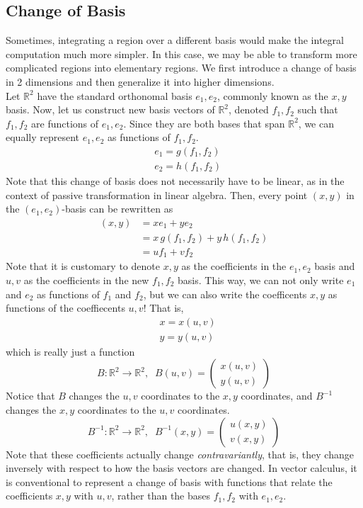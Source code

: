 \documentclass{article}
\theoremstyle{remark}
\theoremstyle{definition}
\begin{document}
\subsection{Change of Basis}
Sometimes, integrating a region over a different basis would make the integral computation much more simpler. In this case, we may be able to transform more complicated regions into elementary regions. We first introduce a change of basis in 2 dimensions and then generalize it into higher dimensions. 
\\
Let $\mathbb{R}^2$ have the standard orthonomal basis $e_1, e_2$, commonly known as the $x, y$ basis. Now, let us construct new basis vectors of $\mathbb{R}^2$, denoted $f_1, f_2$ such that $f_1, f_2$ are functions of $e_1, e_2$. Since they are both bases that span $\mathbb{R}^2$, we can equally represent $e_1, e_2$ as functions of $f_1, f_2$. 
\begin{align*}
    &e_1 = g(f_1, f_2)\\
    &e_2 = h(f_1, f_2) 
\end{align*}
Note that this change of basis does not necessarily have to be linear, as in the context of passive transformation in linear algebra. Then, every point $(x,y)$ in the $(e_1, e_2)$-basis can be rewritten as
\begin{align*}
    (x, y) & = x e_1 + y e_2 \\
    & = x \, g(f_1, f_2) + y \, h(f_1, f_2) \\
    & = u f_1 + v f_2
\end{align*}
Note that it is customary to denote $x, y$ as the coefficients in the $e_1, e_2$ basis and $u, v$ as the coefficients in the new $f_1, f_2$ basis. This way, we can not only write $e_1$ and $e_2$ as functions of $f_1$ and $f_2$, but we can also write the coefficents $x, y$ as functions of the coeffiecents $u, v$! That is, 
\begin{align*}
    & x = x(u, v) \\
    & y = y(u, v)
\end{align*}
which is really just a function 
\[B: \mathbb{R}^2 \longrightarrow \mathbb{R}^2, \;\; B(u, v) = \begin{pmatrix} x(u, v) \\ y(u, v) \end{pmatrix}\]
Notice that $B$ changes the $u, v$ coordinates to the $x, y$ coordinates, and $B^{-1}$ changes the $x, y$ coordinates to the $u, v$ coordinates. 
\[B^{-1}: \mathbb{R}^2 \longrightarrow \mathbb{R}^2, \;\; B^{-1} (x, y) = \begin{pmatrix} u (x, y) \\ v (x, y) \end{pmatrix}\]
Note that these coefficients actually change \textit{contravariantly}, that is, they change inversely with respect to how the basis vectors are changed. In vector calculus, it is conventional to represent a change of basis with functions that relate the coefficients $x, y$ with $u, v$, rather than the bases $f_1, f_2$ with $e_1, e_2$. 
\end{document}
